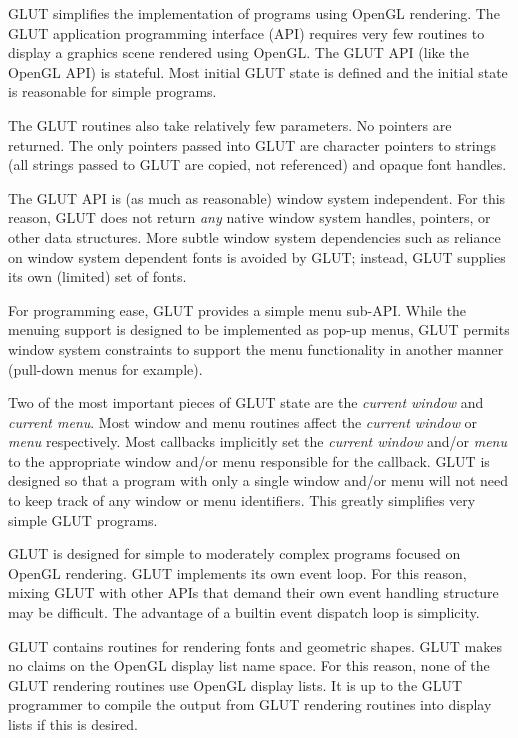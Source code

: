 GLUT simplifies the implementation of programs using OpenGL rendering.
The GLUT application programming interface (API) requires very few routines
to display a graphics scene rendered using OpenGL.  The GLUT API (like the OpenGL
API) is stateful.  Most initial GLUT state is defined and the
initial state is reasonable for simple programs.

The GLUT routines also take relatively few parameters.
No pointers are returned.  The only pointers passed into GLUT are character pointers
to strings (all strings passed to GLUT are copied, not referenced)
and opaque font handles.

The GLUT API is (as much as reasonable) window system independent.  For
this reason, GLUT does not return {\em any} native window system handles,
pointers, or other data structures.  More subtle window system dependencies
such as reliance on window system dependent fonts is avoided by GLUT; instead,
GLUT supplies its own (limited) set of fonts. 


For programming ease, GLUT provides a simple menu sub-API.  While the menuing
support is designed to be implemented as pop-up menus, GLUT permits window system
constraints to support the menu functionality in another manner (pull-down menus
for example).

Two of the most important pieces of GLUT state are the {\em current window}
and {\em current menu}.  Most window and menu routines affect the {\em
current window} or {\em menu} respectively.  Most callbacks implicitly
set the {\em current window} and/or {\em menu} to the appropriate
window and/or menu responsible for the callback.  GLUT is designed
so that a program with only a single window and/or menu will not need
to keep track of any window or menu identifiers.  This greatly
simplifies very simple GLUT programs.

GLUT is designed for simple to moderately complex programs focused on OpenGL
rendering.  GLUT implements its own event loop.  For this reason, mixing GLUT
with other APIs that demand their own event handling structure may be difficult.
The advantage of a builtin event dispatch loop is simplicity.

GLUT contains routines for rendering fonts and geometric shapes.  GLUT makes
no claims on the OpenGL display list name space.  For this reason, none of the
GLUT rendering routines use OpenGL display lists.  It is up to the GLUT programmer
to compile the output from GLUT rendering routines into display lists
if this is desired.

